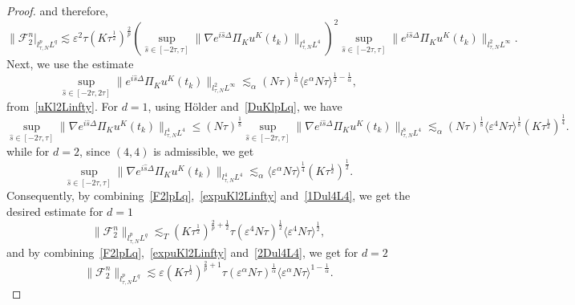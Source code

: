 \documentclass[10pt,a4paper]{article}
\begin{document}
\begin{proof}
    and therefore,
    \begin{equation}\label{F2lpLq}
      \|\mathcal F_2^n |_{l^p_{\tau, N}L^q} \lesssim \varepsilon^2 \tau 
      (K\tau^\frac12)^\frac2p \left(\sup_{\hat{s} \in [-2\tau,\tau]}  
      \|\nabla e^{i\hat{s}\Delta}\Pi_K u^K(t_k)\|_{l^4_{\tau, N}L^4}  \right)^2 
      \sup_{\hat s \in [-2\tau, \tau]} \|e^{i\hat{s}\Delta}\Pi_K u^K(t_k)\|_{l^2_{\tau, N}L^\infty}.
    \end{equation}
    Next, we use the estimate
    \begin{equation}\label{expuKl2Linfty}
      \sup_{\hat s \in [-2\tau, 2\tau]} \|e^{i \hat s\Delta }\Pi_{K} u^K(t_{k})\|_{l^2_{\tau, N}L^\infty} 
      \lesssim_{\alpha} {(N\tau)}^\frac1\alpha {\langle\varepsilon^\alpha N\tau\rangle}^{\frac12-\frac1\alpha},
    \end{equation}
    from~\eqref{uKl2Linfty}. %
    For \(d=1\), using H\"older and~\eqref{DuKlpLq}, we have
    \begin{equation}\label{1Dul4L4}
      \sup_{\hat{s} \in [-2\tau,\tau]} \|\nabla e^{i\hat{s}\Delta}\Pi_K u^K(t_k)\|_{l^4_{\tau, N}L^4}
    \leq (N\tau)^\frac18 \sup_{\hat{s} \in [-2\tau,\tau]} \|\nabla e^{i\hat{s}\Delta}\Pi_K u^K(t_k)\|_{l^8_{\tau, N}L^4}
    \lesssim_\alpha (N\tau)^\frac18 \langle\varepsilon^4 N\tau\rangle^\frac18 (K\tau^\frac12)^\frac14.
    \end{equation}
    while for \(d=2\), since \((4,4)\) is admissible, we get 
    \begin{equation}\label{2Dul4L4}
      \sup_{\hat{s} \in [-2\tau,\tau]} \|\nabla e^{i\hat{s}\Delta}\Pi_K u^K(t_k)\|_{l^4_{\tau, N}L^4}
    \lesssim_\alpha \langle\varepsilon^\alpha N\tau\rangle^\frac14 (K\tau^\frac12)^\frac12.
    \end{equation}
    Consequently, by combining~\eqref{F2lpLq},~\eqref{expuKl2Linfty} and~\eqref{1Dul4L4},
    we get the desired estimate for \(d=1\)
    \[ \| \mathcal F_2^n \|_{l^p_{\tau,N}L^q} \lesssim_T (K\tau^\frac12)^{\frac2p+\frac12} \tau 
    {(\varepsilon^4 N\tau)}^\frac12 {\langle\varepsilon^4
    N\tau\rangle}^\frac12 , \]
    and by combining~\eqref{F2lpLq},~\eqref{expuKl2Linfty} and~\eqref{2Dul4L4},
    we get for \(d=2\)
    \[ \| \mathcal F_2^n \|_{l^p_{\tau,N}L^q} \lesssim \varepsilon (K\tau^\frac12)^{\frac2p+1} \tau 
    {(\varepsilon^\alpha N\tau)}^\frac1\alpha {\langle\varepsilon^\alpha N\tau\rangle}^{1-\frac1\alpha} .\]

\end{proof}
\end{document}
